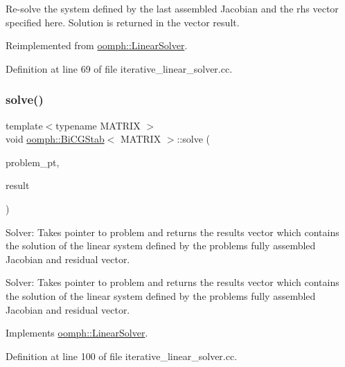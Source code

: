 Re-\/solve the system defined by the last assembled Jacobian and the rhs vector specified here. Solution is returned in the vector result. 



Reimplemented from \hyperlink{classoomph_1_1LinearSolver_a3b310d08333033edc119b2a5bd7dcbfb}{oomph\+::\+Linear\+Solver}.



Definition at line 69 of file iterative\+\_\+linear\+\_\+solver.\+cc.

\mbox{\label{classoomph_1_1BiCGStab_a56e2df052fee2e26ffec644ad9161864}} 
\subsubsection{\texorpdfstring{solve()}{solve()}\hspace{0.1cm}{\footnotesize\ttfamily [1/3]}}
{\footnotesize\ttfamily template$<$typename M\+A\+T\+R\+IX $>$ \\
void \hyperlink{classoomph_1_1BiCGStab}{oomph\+::\+Bi\+C\+G\+Stab}$<$ M\+A\+T\+R\+IX $>$\+::solve (\begin{DoxyParamCaption}\item[{\hyperlink{classoomph_1_1Problem}{Problem} $\ast$const \&}]{problem\+\_\+pt,  }\item[{\hyperlink{classoomph_1_1DoubleVector}{Double\+Vector} \&}]{result }\end{DoxyParamCaption})\hspace{0.3cm}{\ttfamily [virtual]}}



Solver\+: Takes pointer to problem and returns the results vector which contains the solution of the linear system defined by the problem\textquotesingle{}s fully assembled Jacobian and residual vector. 

Solver\+: Takes pointer to problem and returns the results vector which contains the solution of the linear system defined by the problem\textquotesingle{}s fully assembled Jacobian and residual vector. 

Implements \hyperlink{classoomph_1_1LinearSolver_a15ce22542b74ed1826ea485edacbeb6e}{oomph\+::\+Linear\+Solver}.



Definition at line 100 of file iterative\+\_\+linear\+\_\+solver.\+cc.



